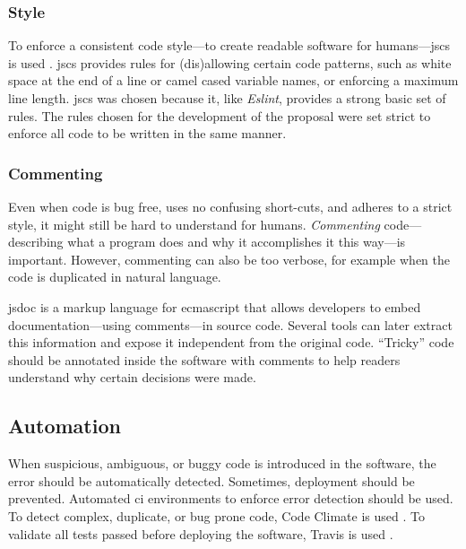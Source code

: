 \subsubsection{Style}\label{style}

To enforce a consistent code style---to create readable software for
  humans---\acrshort{jscs} is used \autocite{mdevils/node-jscs-source-code}.
\acrshort{jscs} provides rules for (dis)allowing certain code patterns,
  such as white space at the end of a line or camel cased variable names,
  or enforcing a maximum line length.
\acrshort{jscs} was chosen because it, like \emph{Eslint}, provides a strong
  basic set of rules.
The rules chosen for the development of the proposal were set strict to
  enforce all code to be written in the same manner.

\subsubsection{Commenting}\label{commenting}

Even when code is bug free, uses no confusing short-cuts, and adheres to a
  strict style, it might still be hard to understand for humans.
\emph{Commenting} code---describing what a program does and why it
  accomplishes it this way---is important.
However, commenting can also be too verbose, for example when the code is
  duplicated in natural language.

\gls{jsdoc} \autocite{google.com-clojure-compiler-jsdoc} is a markup language
  for \gls{ecmascript} that allows developers to embed documentation---using
  comments---in source code.
Several tools can later extract this information and expose it independent
  from the original code.
``Tricky'' code should be annotated inside the software with comments to help
  readers understand why certain decisions were made.

\subsection{Automation}\label{automation}

When suspicious, ambiguous, or buggy code is introduced in the software, the
  error should be automatically detected.
Sometimes, deployment should be prevented.
Automated \gls{ci} environments to enforce error detection should be used.
To detect complex, duplicate, or bug prone code, Code Climate is used
  \autocite{codeclimate.com}.
To validate all tests passed before deploying the software, Travis is used
  \autocite{travis-ci.org}.

